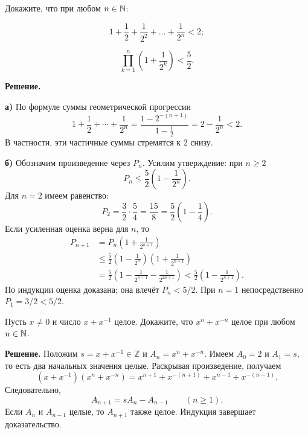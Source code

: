 \begin{problems}
\item Докажите, что при любом $n\in\mathbb{N}$:
\begin{parts}
  \item
  \[
  1+\frac12+\frac1{2^2}+\ldots+\frac1{2^n}<2;
  \]
  \item
  \[
  \prod_{k=1}^{n}\left(1+\frac1{2^k}\right)<\frac52.
  \]
\end{parts}
\par\smallskip\noindent\textbf{Решение.} \par\textbf{а)} По формуле суммы геометрической прогрессии
\[
1+\frac12+\cdots+\frac1{2^n}
=\frac{1-2^{-(n+1)}}{1-\frac12}
=2-\frac1{2^n}<2.
\]
В частности, эти частичные суммы стремятся к $2$ снизу.
\par\textbf{б)} Обозначим произведение через $P_n$. Усилим утверждение: при $n\ge2$
\[
P_n\le\frac52\left(1-\frac1{2^n}\right).
\]
Для $n=2$ имеем равенство:
\[
P_2=\frac32\cdot\frac54=\frac{15}{8}
=\frac52\left(1-\frac14\right).
\]
Если усиленная оценка верна для $n$, то
\[
\begin{aligned}
P_{n+1}
&=P_n\left(1+\frac1{2^{n+1}}\right)\\
&\le\frac52\left(1-\frac1{2^n}\right)
             \left(1+\frac1{2^{n+1}}\right)\\
&=\frac52\left(1-\frac1{2^{n+1}}-\frac1{2^{2n+1}}\right)
<\frac52\left(1-\frac1{2^{n+1}}\right).
\end{aligned}
\]
По индукции оценка доказана; она влечёт $P_n<5/2$. При $n=1$ непосредственно $P_1=3/2<5/2$.\par

\item Пусть $x\ne0$ и число $x+x^{-1}$ целое. Докажите, что $x^n+x^{-n}$ целое при любом $n\in\mathbb{N}$.
\par\smallskip\noindent\textbf{Решение.} Положим $s=x+x^{-1}\in\mathbb Z$ и $A_n=x^n+x^{-n}$. Имеем $A_0=2$ и $A_1=s$, то есть два начальных значения целые. Раскрывая произведение, получаем
\[
(x+x^{-1})(x^n+x^{-n})
=x^{n+1}+x^{-(n+1)}+x^{n-1}+x^{-(n-1)}.
\]
Следовательно,
\[
A_{n+1}=sA_n-A_{n-1}\qquad(n\ge1).
\]
Если $A_n$ и $A_{n-1}$ целые, то $A_{n+1}$ также целое. Индукция завершает доказательство.\par


\end{problems}
